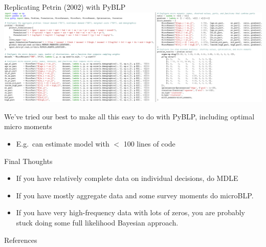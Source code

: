 \documentclass[aspectratio=169,10pt]{beamer}
\begin{document}
\begin{frame}{Replicating Petrin (2002) with PyBLP}
    \vspace{0.5em}
    \includegraphics[width=\textwidth]{resources/petrin.png}
    \begin{wideitemize}
        \item We've tried our best to make all this easy to do with \alert{PyBLP}, including optimal micro moments
        \begin{itemize}
            \item E.g.\ can estimate  model with $<$ 100 lines of code
        \end{itemize}
    \end{wideitemize}
\end{frame}


\begin{frame}{Final Thoughts}
\begin{itemize}
    \item If you have relatively complete data on individual decisions, do MDLE
    \item If you have mostly aggregate data and some survey moments do microBLP.
    \item If you have very high-frequency data with lots of zeros, you are probably stuck doing some full likelihood Bayesian approach.
\end{itemize}
\end{frame}

\appendix

\begin{frame}{References}
    
\end{frame}
\end{document}
